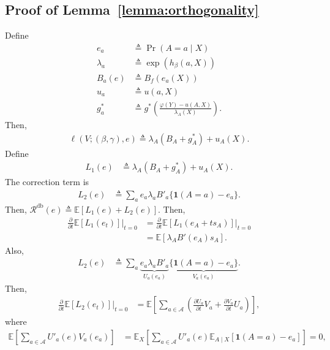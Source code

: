 \subsection*{Proof of Lemma~\ref{lemma:orthogonality}}
Define 
\begin{align}
    e_a &\triangleq \Pr(A=a \mid X) \\ 
    \lambda_{a} &\triangleq \exp(h_{\beta}(a,X)) \\ 
    B_a(e) &\triangleq B_f(e_a(X)) \\ 
    u_a &\triangleq u(a,X) \\ 
    g^{\ast}_a &\triangleq g^{\ast}\left( \frac{\varphi(Y) - u(A,X)}{\lambda_A(X)} \right).
\end{align}
Then, 
\begin{align}
    \ell(V;(\beta,\gamma),e) \triangleq \lambda_A(B_A + g^{\ast}_A) + u_A(X). 
\end{align}
Define 
\begin{align}
    L_1(e) &\triangleq  \lambda_A(B_A + g^{\ast}_A) + u_A(X). 
\end{align}
The correction term is 
\begin{align}
    L_2(e) &\triangleq \sum_{a} e_a \lambda_a B'_a \{\boldsymbol{1}(A=a) - e_a\}. 
\end{align}
Then, $\mathcal{R}^{\mathrm{db}}(e) \triangleq \mathbb{E}[L_1(e) + L_2(e)]$. Then,
\begin{align}
    \frac{\partial}{\partial t}\mathbb{E}[L_1(e_t)]\bigg\vert_{t=0} &= \frac{\partial}{\partial t}\mathbb{E}[L_1(e_A + ts_A)]\bigg\vert_{t=0} \\ 
    &= \mathbb{E}\left[\lambda_A B'(e_A) s_A \right]. 
\end{align}
Also, 
\begin{align}
    L_2(e) &\triangleq \sum_{a} \underbrace{e_a \lambda_a B'_a}_{U_a(e_a)} \underbrace{\{\boldsymbol{1}(A=a) - e_a\}}_{V_a(e_a)}. 
\end{align}
Then, 
\begin{align}
    \frac{\partial}{\partial t}\mathbb{E}[L_2(e_t)]\bigg\vert_{t=0} &= \mathbb{E}\left[\sum_{a \in \mathcal{A}} \left( \frac{\partial U_a}{\partial t}V_a + \frac{\partial V_a}{\partial t}U_a \right)  \right], 
\end{align}
where 
\begin{align}
    \mathbb{E}\left[ \sum_{a \in \mathcal{A}}U'_a(e)V_a(e_a) \right] &= \mathbb{E}_{X}\left[ \sum_{a \in \mathcal{A}}U'_a(e) \mathbb{E}_{A \mid X}[\boldsymbol{1}(A=a) - e_a] \right]  = 0,
\end{align}
